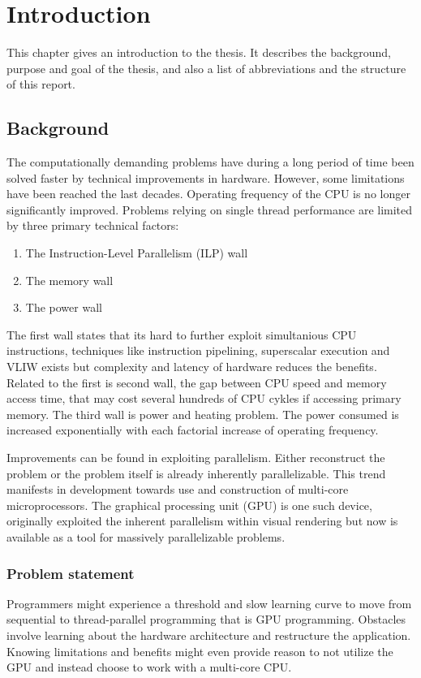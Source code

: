 \chapter{Introduction}\label{cha:intro}
This chapter gives an introduction to the thesis. It describes the background, purpose and goal of the thesis, and also a list of abbreviations and the structure of this report.

\section{Background}
The computationally demanding problems have during a long period of time been solved faster by technical improvements in hardware. However, some limitations have been reached the last decades. Operating frequency of the CPU is no longer significantly improved. Problems relying on single thread performance are limited by three primary technical factors:
\begin{enumerate}
	\item The Instruction-Level Parallelism (ILP) wall
	\item The memory wall
	\item The power wall
\end{enumerate}

The first wall states that its hard to further exploit simultanious CPU instructions, techniques like instruction pipelining, superscalar execution and VLIW exists but complexity and latency of hardware reduces the benefits. Related to the first is second wall, the gap between CPU speed and memory access time, that may cost several hundreds of CPU cykles if accessing primary memory. The third wall is power and heating problem. The power consumed is increased exponentially with each factorial increase of operating frequency.

Improvements can be found in exploiting parallelism. Either reconstruct the problem or the problem itself is already inherently parallelizable. This trend manifests in development towards use and construction of multi-core microprocessors. The graphical processing unit (GPU) is one such device, originally exploited the inherent parallelism within visual rendering but now is available as a tool for massively parallelizable problems.

\subsection{Problem statement}
Programmers might experience a threshold and slow learning curve to move from sequential to thread-parallel programming that is GPU programming. Obstacles involve learning about the hardware architecture and restructure the application. Knowing limitations and benefits might even provide reason to not utilize the GPU and instead choose to work with a multi-core CPU.

